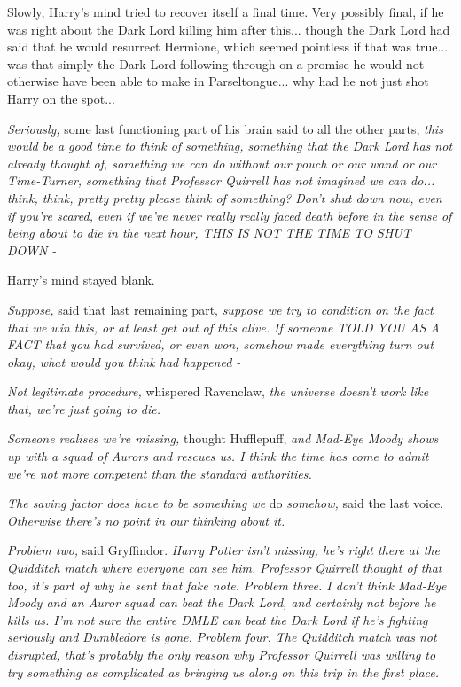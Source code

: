 Slowly, Harry's mind tried to recover itself a final time. Very possibly final, if he was right about the Dark Lord killing him after this... though the Dark Lord had said that he would resurrect Hermione, which seemed pointless if that was true... was that simply the Dark Lord following through on a promise he would not otherwise have been able to make in Parseltongue... why had he not just shot Harry on the spot...

\emph{Seriously,} some last functioning part of his brain said to all the other parts, \emph{this would be a good time to think of something, something that the Dark Lord has not already thought of, something we can do without our pouch or our wand or our Time-Turner, something that Professor Quirrell has not imagined we can do... think, think, pretty pretty please think of something? Don't shut down now, even if you're scared, even if we've never really really faced death before in the sense of being about to die in the next hour, THIS IS NOT THE TIME TO SHUT DOWN -}

Harry's mind stayed blank.

\emph{Suppose,} said that last remaining part, \emph{suppose we try to condition on the fact that we win this, or at least get out of this alive. If someone TOLD YOU AS A FACT that you had survived, or even won, somehow made everything turn out okay, what would you think had happened -}

\emph{Not legitimate procedure,} whispered Ravenclaw, \emph{the universe doesn't work like that, we're just going to die.}

\emph{Someone realises we're missing,} thought Hufflepuff, \emph{and Mad-Eye Moody shows up with a squad of Aurors and rescues us. I think the time has come to admit we're not more competent than the standard authorities.}

\emph{The saving factor does have to be something we} do \emph{somehow,} said the last voice. \emph{Otherwise there's no point in our thinking about it.}

\emph{Problem two,} said Gryffindor. \emph{Harry Potter isn't missing, he's right there at the Quidditch match where everyone can see him. Professor Quirrell thought of that too, it's part of why he sent that fake note. Problem three. I don't think Mad-Eye Moody and an Auror squad can beat the Dark Lord, and certainly not before he kills us. I'm not sure the entire DMLE can beat the Dark Lord if he's fighting seriously and Dumbledore is gone. Problem four. The Quidditch match was not disrupted, that's probably the only reason why Professor Quirrell was willing to try something as complicated as bringing us along on this trip in the first place.}

